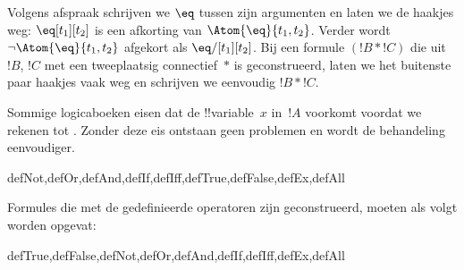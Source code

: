 \documentclass[openany]{memoir}
\begin{document}
Volgens afspraak schrijven we $\eq$ tussen zijn argumenten en laten we
de haakjes weg: $\eq[t_1][t_2]$ is een afkorting van
$\Atom{\eq}{t_1,t_2}$. Verder wordt $\lnot \Atom{\eq}{t_1,t_2}$
afgekort als $\eq/[t_1][t_2]$. Bij een formule $(!B \ast !C)$ die uit
$!B$, $!C$ met een tweeplaatsig connectief~$\ast$ is geconstrueerd,
laten we het buitenste paar haakjes vaak weg en schrijven we eenvoudig
$!B \ast !C$.

\begin{intro}
Sommige logicaboeken eisen dat de !!{variable}~$x$ in~$!A$ voorkomt
voordat we
%
%
%
rekenen tot
.
Zonder deze eis ontstaan geen problemen en wordt de behandeling
eenvoudiger.
\end{intro}

\begin{tagblock}{defNot,defOr,defAnd,defIf,defIff,defTrue,defFalse,defEx,defAll}
\begin{defn}
Formules die met de gedefinieerde operatoren zijn geconstrueerd, moeten
als volgt worden opgevat:

\begin{tagenumerate}{defTrue,defFalse,defNot,defOr,defAnd,defIf,defIff,defEx,defAll}









\end{tagenumerate}
\end{defn}
\end{tagblock}
\end{document}
